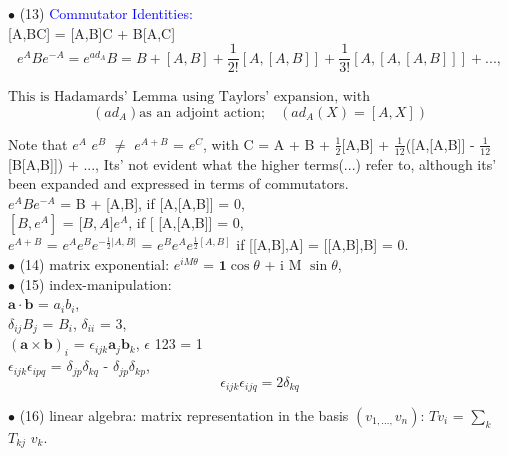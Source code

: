 \documentclass[a4paper, 10pt, onepage]{elegantbook}
\begin{document}
{$\bullet$ (13) \textcolor{blue}{Commutator Identities:} \\

[A,BC] = [A,B]C + B[A,C] \\

\begin{equation} \label{eq:adjoint-action}
e^A Be^{-A} = e^{ad_A}B = B + [A,B] + \frac{1}{2!} [A,[A,B]] + \frac{1}{3!} [A,[A,[A,B]]] +...,
\end{equation}
 
$\text{This is Hadamards' Lemma using Taylors' expansion, with}$
\begin{equation}
(ad_A) \text{as an adjoint action;}\quad (ad_A(X) = [A,X])
\end{equation}

Note that $e^A$ $e^B$ $\neq$ $e^{A + B}$ = $e^C$, with C = A + B + $\frac{1}{2}$[A,B] + $\frac{1}{12}$([A,[A,B]] - $\frac{1}{12}$[B[A,B]]) + ...,  
Its' not evident what the higher terms(...) refer to, although its' been expanded and expressed in terms of commutators. \\
 
$e^A Be^{-A}$ = B + [A,B], if  [A,[A,B]] = 0, \\ 

$[B,e^A]$ = [$B,A]e^A$, if [ [A,[A,B]] = 0, \\
 
$e^{A + B}$ = $e^A e^B e^{-\frac{1}{2}|A,B|}$ = $e^B e^A e^{\frac{1}{2}[A,B]}$ if [[A,B],A] = [[A,B],B] = 0. \\

$\bullet$ (14) matrix exponential: $e^{i M \theta}$ = $\mathbf{1} \cos \theta$ + i M $\sin \theta$,  \\

$\bullet$ (15) index-manipulation:  \\
$\mathbf a \cdot \mathbf b$ = $a_i b_i$,  \\
$\delta_{ij} B_j$ = $B_i$, $\delta_{ii}$ = 3, \\
${(\mathbf a \times \mathbf b)}_i$ = $\epsilon_{ijk} \mathbf a_j \mathbf b_k$, $\epsilon$ 123 = 1  \\
$\epsilon_{ijk} \epsilon_{ipq}$ = $\delta_{jp} \delta_{kq}$ - $\delta_{jp} \delta_{kp}$,
\begin{equation}
\epsilon_{ijk} \epsilon_{ijq} = 2 \delta_{kq}
\end{equation}

$\bullet$ (16) linear algebra: matrix representation in the basis $(v_{1,...,}v_n)$: $Tv_i$ = $\sum_k $ $T_{kj}$ $v_k$.  \\

}
\end{document}
